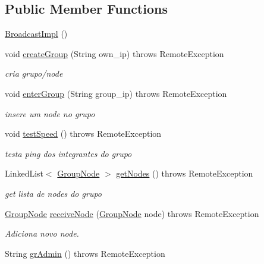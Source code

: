 \subsection*{Public Member Functions}
\begin{DoxyCompactItemize}
\item 
\hyperlink{classserver_1_1_broadcast_impl_a32e3892e38d83045f927f81bca2a0ed9}{Broadcast\+Impl} ()
\item 
void \hyperlink{classserver_1_1_broadcast_impl_a433529db2e96faf096881d1c38033b45}{create\+Group} (String own\+\_\+ip)  throws Remote\+Exception 
\begin{DoxyCompactList}\small\item\em cria grupo/node \end{DoxyCompactList}\item 
void \hyperlink{classserver_1_1_broadcast_impl_a35a07b1f98aaaa51493cd6ff28d6b90d}{enter\+Group} (String group\+\_\+ip)  throws Remote\+Exception 
\begin{DoxyCompactList}\small\item\em insere um node no grupo \end{DoxyCompactList}\item 
void \hyperlink{classserver_1_1_broadcast_impl_a1ddfea5e6826ec8ff3e6aa3a3a525ccb}{test\+Speed} ()  throws Remote\+Exception 
\begin{DoxyCompactList}\small\item\em testa ping dos integrantes do grupo \end{DoxyCompactList}\item 
Linked\+List$<$ \hyperlink{classstructure_1_1_group_node}{Group\+Node} $>$ \hyperlink{classserver_1_1_broadcast_impl_aa6f1dcfe6e97de483e26a2c0a37688d3}{get\+Nodes} ()  throws Remote\+Exception 
\begin{DoxyCompactList}\small\item\em get lista de nodes do grupo \end{DoxyCompactList}\item 
\hyperlink{classstructure_1_1_group_node}{Group\+Node} \hyperlink{classserver_1_1_broadcast_impl_a15437fb9a1caea537b29d0ded4809e32}{receive\+Node} (\hyperlink{classstructure_1_1_group_node}{Group\+Node} node)  throws Remote\+Exception 
\begin{DoxyCompactList}\small\item\em Adiciona novo node. \end{DoxyCompactList}\item 
String \hyperlink{classserver_1_1_broadcast_impl_ae5995f5346d95cdbcd02361f10158671}{gr\+Admin} ()  throws Remote\+Exception

\end{DoxyCompactItemize}
